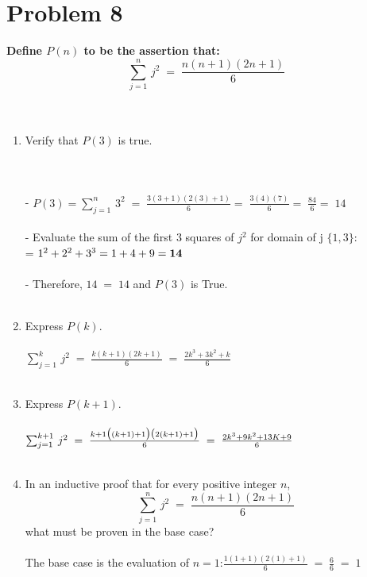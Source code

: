\documentclass{amsart}
\theoremstyle{definition}
\theoremstyle{Exercise}
\theoremstyle{remark}
\theoremstyle{rule}
\numberwithin{equation}{section}
\begin{document}
\section*{Problem 8}
{\bf Define $P(n)$ to be the assertion that:}\\
\[\displaystyle \sum_{j=1}^{n}\, j^2 \;=\;\frac{n(n+1)(2n+1)}{6}\]\\\\
\begin{enumerate}[label=(\alph*)]
  \item Verify that $P(3)$ is true.\\\\
   \\\\
   - $P(3) = \sum_{j=1}^{n}\, 3^2 \;=\;\frac{3(3+1)(2(3)+1)}{6} =\; \frac{3(4)(7)}{6} =\; \frac{84}{6} =\; 14$
   \\\\
   - Evaluate the sum of the first 3 squares of $j^2$ for domain of j $\{1,3\}$:\\
   = $1^2+2^2+3^3 = 1+4+9 = \bf{14}$\\\\
   - Therefore, $14\;=\;14$ and $P(3)$ is True.
   \\\\
  \item Express $P(k)$.\\\\
   $\sum_{j=1}^{k}\, j^2 \;=\;\frac{k(k+1)(2k+1)}{6}\;=\;\frac{2k^3 + 3k^2 + k}{6}$
   \\\\
  \item Express $P(k+1)$.\\\\
   $\sum_{j=1}^{k+1}\, j^2 \;=\;\frac{k+1\big{(}(k+1)+1\big{)(}2(k+1)+1\big{)}}{6}\;=\;\frac{2k^3 + 9k^2 + 13K + 9}{6}$
   \\\\
   \item In an inductive proof that for every positive integer $n$,
   \[\displaystyle \sum_{j=1}^{n}\, j^2 \;=\;\frac{n(n+1)(2n+1)}{6}\]
   what must be proven in the base case?\\\\
    The base case is the evaluation of $n=1$:\;$\frac{1(1+1)(2(1)+1)}{6}\;=\;\frac{6}{6}\;=\;1$ 
    \\\\

\end{enumerate}
\end{document}
